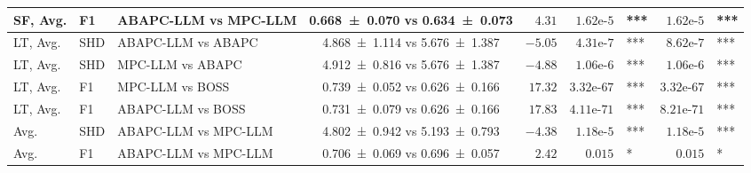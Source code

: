 \begin{table}[t]
{\begin{tabular}{ll l|c|r|rl|rl}
    SF, Avg. & F1 & ABAPC-LLM vs MPC-LLM & \num{0.668 +- 0.070} vs \num{0.634 +- 0.073} & $4.31$ & $1.62\text{e-}5$ & \!\!\!*** & $1.62\text{e-}5$ & \!\!\!*** \\
    \midrule
    LT, Avg. & SHD & ABAPC-LLM vs ABAPC & \num{4.868 +- 1.114} vs \num{5.676 +- 1.387} & $-5.05$ & $4.31\text{e-}7$ & \!\!\!*** & $8.62\text{e-}7$ & \!\!\!*** \\
    LT, Avg. & SHD & MPC-LLM vs ABAPC & \num{4.912 +- 0.816} vs \num{5.676 +- 1.387} & $-4.88$ & $1.06\text{e-}6$ & \!\!\!*** & $1.06\text{e-}6$ & \!\!\!*** \\
    LT, Avg. & F1 & MPC-LLM vs BOSS & \num{0.739 +- 0.052} vs \num{0.626 +- 0.166} & $17.32$ & $3.32\text{e-}67$ & \!\!\!*** & $3.32\text{e-}67$ & \!\!\!*** \\
    LT, Avg. & F1 & ABAPC-LLM vs BOSS & \num{0.731 +- 0.079} vs \num{0.626 +- 0.166} & $17.83$ & $4.11\text{e-}71$ & \!\!\!*** & $8.21\text{e-}71$ & \!\!\!*** \\
    \midrule
    Avg. & SHD & ABAPC-LLM vs MPC-LLM & \num{4.802 +- 0.942} vs \num{5.193 +- 0.793} & $-4.38$ & $1.18\text{e-}5$ & \!\!\!*** & $1.18\text{e-}5$ & \!\!\!*** \\
    Avg. & F1 & ABAPC-LLM vs MPC-LLM & \num{0.706 +- 0.069} vs \num{0.696 +- 0.057} & $2.42$ & $0.015$ & \!\!\!* & $0.015$ & \!\!\!* \\
    \bottomrule
    \end{tabular}
    }
\end{table}
